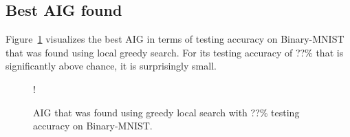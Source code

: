 \subsection{Best AIG found} \label{app:aig-mnist}
Figure~\ref{fig:aig-mnist} visualizes the best AIG in terms of testing accuracy on Binary-MNIST that was found using local greedy search. For its testing accuracy of ??\% that is significantly above chance, it is surprisingly small.

\begin{figure}[!htb]
    \centering
    \resizebox {0.45\textwidth} {!} {
      
    }
      \caption{AIG that was found using greedy local search with ??\% testing accuracy on Binary-MNIST.}
\label{fig:aig-mnist}
\end{figure}
\FloatBarrier
